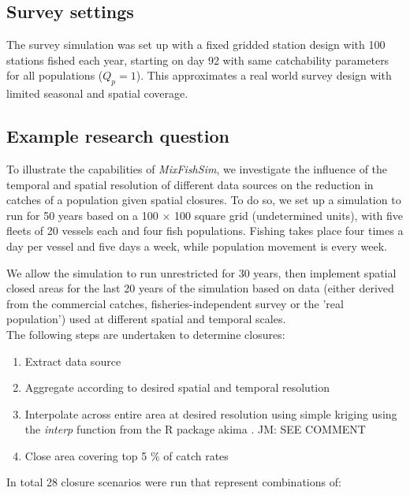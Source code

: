\documentclass[review]{elsarticle}
\begin{document}
\subsection{Survey settings}

The survey simulation was set up with a fixed gridded station design with 100
stations fished each year, starting on day 92  with same catchability parameters for all
populations ($Q_{p} = 1$). This approximates a real world survey design with
limited seasonal and spatial coverage. 

\subsection{Example research question}

To illustrate the capabilities of \emph{MixFishSim}, we investigate the
influence of the temporal and spatial resolution of different data sources on
the reduction in catches of a population given spatial closures. To do so, we
set up a simulation to run for 50 years based on a 100 $\times$ 100 square grid
(undetermined units), with five fleets of 20 vessels each and four fish
populations. Fishing takes place four times a day per vessel and five days a
week, while population movement is every week.

We allow the simulation to run unrestricted for 30 years,
then implement spatial closed areas for the last 20 years of the simulation
based on data (either derived from the commercial catches,
fisheries-independent survey or the 'real population') used at different
spatial and temporal scales. \\

The following steps are undertaken to determine closures:
\begin{enumerate}
	\item Extract data source
	\item Aggregate according to desired spatial and temporal resolution
	\item Interpolate across entire area at desired resolution using simple
		kriging using the \emph{interp} function from the R package
		akima \citep{Akima2006}. JM: SEE COMMENT
	\item Close area covering top 5 \% of catch rates 
\end{enumerate}
In total 28 closure scenarios were run that represent combinations of:
\end{document}
